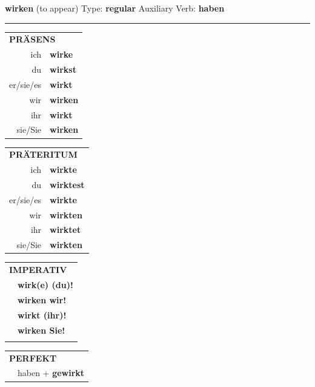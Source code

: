 \documentclass[10pt,a4paper]{revtex4-2}
\begin{document}
\begin{verbbox}
    {\Large \bf wirken} (to appear) \hfill Type: \textbf{regular} \hfill Auxiliary Verb: \textbf{haben} 
    
     \vspace{5pt}

    \hrule
    
    \vspace{5pt}

  \begin{tabular}{rl}
     \multicolumn{2}{l}{\textbf{PRÄSENS} }\\
    ich & \textbf{wirke}\\
    du & \textbf{wirkst}\\
    er/sie/es & \textbf{wirkt}\\
    wir & \textbf{wirken}\\
    ihr & \textbf{wirkt}\\
    sie/Sie & \textbf{wirken}\\
  \end{tabular}
  \hfill
     \begin{tabular}{rl}
    \multicolumn{2}{l}{\textbf{PRÄTERITUM} }\\
    ich & \textbf{wirkte}\\
    du & \textbf{wirktest}\\
    er/sie/es & \textbf{wirkte}\\
    wir & \textbf{wirkten}\\
    ihr & \textbf{wirktet}\\
    sie/Sie & \textbf{wirkten}\\
  \end{tabular}
  \hfill
  \begin{tabular}{rl}
     \multicolumn{2}{l}{\textbf{IMPERATIV} }\\
   & \textbf{wirk(e) (du)!}\\
   & \textbf{wirken wir!}\\
   & \textbf{wirkt (ihr)!}\\
   & \textbf{wirken Sie!}\\
   & \vspace{10pt}
  \end{tabular}

    \vspace{10pt}

 \begin{tabular}{rl}
     \multicolumn{2}{l}{\textbf{PERFEKT}}\\
  &  haben + \textbf{gewirkt}\\
  \end{tabular}
\hfill
   \begin{tabular}{rl}
   

\end{tabular}
\end{verbbox}
\end{document}
